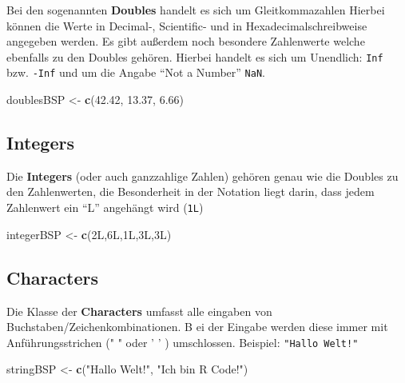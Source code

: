\documentclass[
]{book}
\newenvironment{Shaded}{\begin{snugshade}}{\end{snugshade}}
\newcommand{\FloatTok}[1]{\textcolor[rgb]{0.00,0.00,0.81}{#1}}
\newcommand{\KeywordTok}[1]{\textcolor[rgb]{0.13,0.29,0.53}{\textbf{#1}}}
\newcommand{\NormalTok}[1]{#1}
\newcommand{\StringTok}[1]{\textcolor[rgb]{0.31,0.60,0.02}{#1}}
\begin{document}
Bei den sogenannten \textbf{Doubles} handelt es sich um Gleitkommazahlen Hierbei können die Werte in Decimal-, Scientific- und in Hexadecimalschreibweise angegeben werden.
Es gibt außerdem noch besondere Zahlenwerte welche ebenfalls zu den Doubles gehören.
Hierbei handelt es sich um Unendlich: \texttt{Inf} bzw. \texttt{-Inf} und um die Angabe ``Not a Number'' \texttt{NaN}.

\begin{Shaded}
\begin{Highlighting}[]
\NormalTok{doublesBSP <-}\StringTok{ }\KeywordTok{c}\NormalTok{(}\FloatTok{42.42}\NormalTok{, }\FloatTok{13.37}\NormalTok{, }\FloatTok{6.66}\NormalTok{)}
\end{Highlighting}
\end{Shaded}

\hypertarget{integers}{%
\subsection{Integers}\label{integers}}

Die \textbf{Integers} (oder auch ganzzahlige Zahlen) gehören genau wie die Doubles zu den Zahlenwerten, die Besonderheit in der Notation liegt darin, dass jedem Zahlenwert ein ``L'' angehängt wird (\texttt{1L})

\begin{Shaded}
\begin{Highlighting}[]
\NormalTok{integerBSP <-}\StringTok{ }\KeywordTok{c}\NormalTok{(2L,6L,1L,3L,3L)}
\end{Highlighting}
\end{Shaded}

\hypertarget{characters}{%
\subsection{Characters}\label{characters}}

Die Klasse der \textbf{Characters} umfasst alle eingaben von Buchstaben/Zeichenkombinationen. B
ei der Eingabe werden diese immer mit Anführungsstrichen (" " oder ' ' ) umschlossen. Beispiel: \texttt{"Hallo\ Welt!"}

\begin{Shaded}
\begin{Highlighting}[]
\NormalTok{stringBSP <-}\StringTok{ }\KeywordTok{c}\NormalTok{(}\StringTok{"Hallo Welt!"}\NormalTok{, }\StringTok{"Ich bin R Code!"}\NormalTok{)}
\end{Highlighting}
\end{Shaded}
\end{document}
